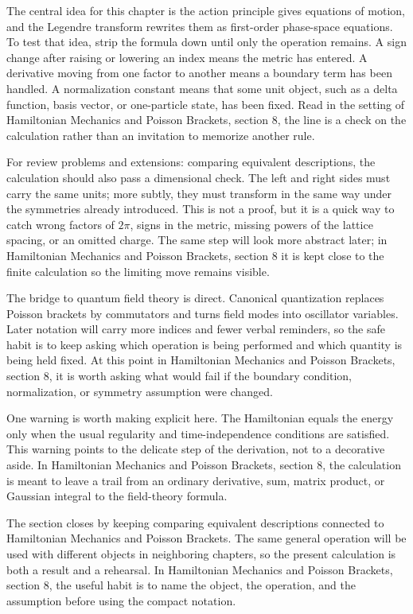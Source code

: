 The central idea for this chapter is the action principle gives equations of motion, and the Legendre transform rewrites them as first-order phase-space equations.  To test that idea, strip the formula down until only the operation remains.  A sign change after raising or lowering an index means the metric has entered.  A derivative moving from one factor to another means a boundary term has been handled.  A normalization constant means that some unit object, such as a delta function, basis vector, or one-particle state, has been fixed.  Read in the setting of Hamiltonian Mechanics and Poisson Brackets, section 8, the line is a check on the calculation rather than an invitation to memorize another rule.

For review problems and extensions: comparing equivalent descriptions, the calculation should also pass a dimensional check.  The left and right sides must carry the same units; more subtly, they must transform in the same way under the symmetries already introduced.  This is not a proof, but it is a quick way to catch wrong factors of \(2\pi\), signs in the metric, missing powers of the lattice spacing, or an omitted charge.  The same step will look more abstract later; in Hamiltonian Mechanics and Poisson Brackets, section 8 it is kept close to the finite calculation so the limiting move remains visible.

The bridge to quantum field theory is direct.  Canonical quantization replaces Poisson brackets by commutators and turns field modes into oscillator variables.  Later notation will carry more indices and fewer verbal reminders, so the safe habit is to keep asking which operation is being performed and which quantity is being held fixed.  At this point in Hamiltonian Mechanics and Poisson Brackets, section 8, it is worth asking what would fail if the boundary condition, normalization, or symmetry assumption were changed.

One warning is worth making explicit here.  The Hamiltonian equals the energy only when the usual regularity and time-independence conditions are satisfied.  This warning points to the delicate step of the derivation, not to a decorative aside.  In Hamiltonian Mechanics and Poisson Brackets, section 8, the calculation is meant to leave a trail from an ordinary derivative, sum, matrix product, or Gaussian integral to the field-theory formula.

The section closes by keeping comparing equivalent descriptions connected to Hamiltonian Mechanics and Poisson Brackets.  The same general operation will be used with different objects in neighboring chapters, so the present calculation is both a result and a rehearsal.  In Hamiltonian Mechanics and Poisson Brackets, section 8, the useful habit is to name the object, the operation, and the assumption before using the compact notation.



